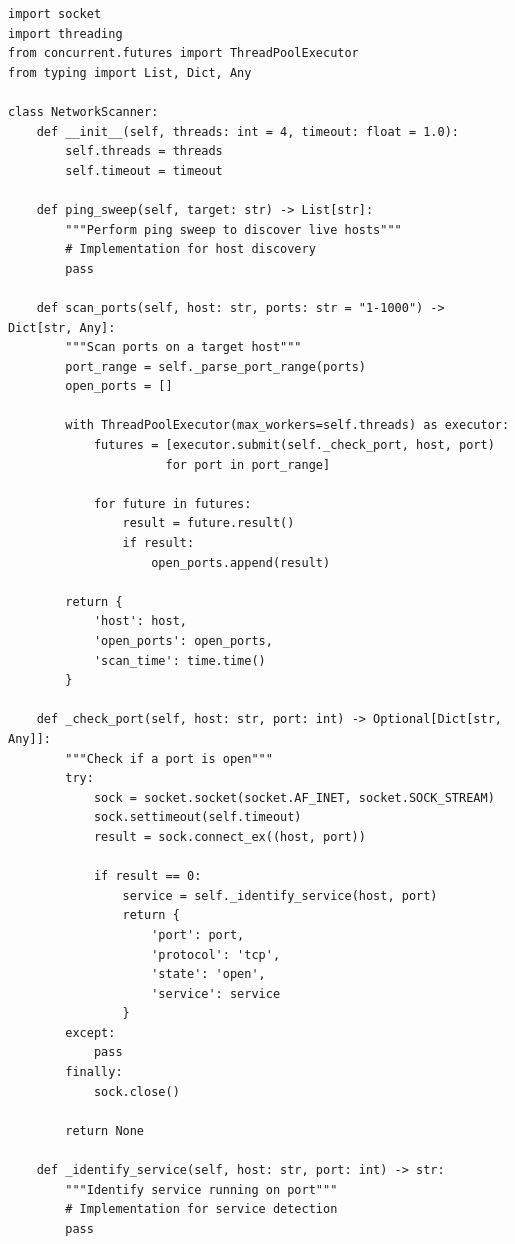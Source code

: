 \documentclass[12pt,a4paper]{report}
\begin{document}
\begin{lstlisting}[caption=Network Scanner Implementation]
import socket
import threading
from concurrent.futures import ThreadPoolExecutor
from typing import List, Dict, Any

class NetworkScanner:
    def __init__(self, threads: int = 4, timeout: float = 1.0):
        self.threads = threads
        self.timeout = timeout
        
    def ping_sweep(self, target: str) -> List[str]:
        """Perform ping sweep to discover live hosts"""
        # Implementation for host discovery
        pass
        
    def scan_ports(self, host: str, ports: str = "1-1000") -> Dict[str, Any]:
        """Scan ports on a target host"""
        port_range = self._parse_port_range(ports)
        open_ports = []
        
        with ThreadPoolExecutor(max_workers=self.threads) as executor:
            futures = [executor.submit(self._check_port, host, port) 
                      for port in port_range]
            
            for future in futures:
                result = future.result()
                if result:
                    open_ports.append(result)
        
        return {
            'host': host,
            'open_ports': open_ports,
            'scan_time': time.time()
        }
    
    def _check_port(self, host: str, port: int) -> Optional[Dict[str, Any]]:
        """Check if a port is open"""
        try:
            sock = socket.socket(socket.AF_INET, socket.SOCK_STREAM)
            sock.settimeout(self.timeout)
            result = sock.connect_ex((host, port))
            
            if result == 0:
                service = self._identify_service(host, port)
                return {
                    'port': port,
                    'protocol': 'tcp',
                    'state': 'open',
                    'service': service
                }
        except:
            pass
        finally:
            sock.close()
        
        return None
    
    def _identify_service(self, host: str, port: int) -> str:
        """Identify service running on port"""
        # Implementation for service detection
        pass
\end{lstlisting}
\end{document}
